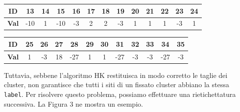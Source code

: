 \vspace{10px}
\noindent
\begin{tabular}{|c|*{12}{c|}}
	\hline
	\textbf{ID}   & 13 & 14 & 15 & 16 & 17 & 18 & 19 & 20 & 21 & 22 & 23 & 24 \\
	\hline
	\textbf{Val}  & -10 & 1 & -10 & -3 & 2 & 2 & -3 & 1 & 1 & 1 & -3 & 1 \\
	\hline
\end{tabular}

\vspace{10px}
\noindent
\begin{tabular}{|c|*{11}{c|}}
	\hline
	\textbf{ID}   & 25 & 26 & 27 & 28 & 29 & 30 & 31 & 32 & 33 & 34 & 35 \\
	\hline
	\textbf{Val}  & 1 & -3 & 18 & -27 & 1 & 1 & -27 & -3 & -3 & -27 & -3 \\
	\hline
\end{tabular}

\vspace{15px}
\noindent
Tuttavia, sebbene l’algoritmo HK restituisca in modo corretto le taglie dei cluster, non garantisce che tutti i siti di un fissato cluster abbiano la stessa \texttt{label}. Per risolvere questo problema, possiamo effettuare una rietichettatura successiva. La Figura 3 ne mostra un esempio.

